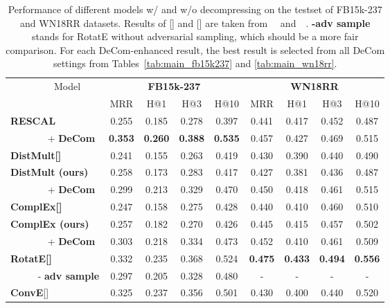 \documentclass[letterpaper]{article} \usepackage{aaai20}  \usepackage{times}  \usepackage{helvet} \usepackage{courier}  \usepackage{booktabs}
\begin{document}
\begin{table*}[t]
    \centering
    \begin{tabular}{|l|cccc|cccc|}
    \toprule
        \multirow{2}{*}{~~~~~~~~~Model} &  \multicolumn{4}{|c|}{\textbf{FB15k-237}} &  \multicolumn{4}{|c|}{\textbf{WN18RR}} \\
         &  MRR & H@1 & H@3&  H@10&  MRR & H@1 & H@3 & H@10\\
        \midrule
        \textbf{RESCAL} & 0.255 & 0.185 & 0.278 & 0.397 & 0.441 & 0.417 & 0.452 & 0.487\\
        ~~~~~~~ + \textbf{DeCom} & \textbf{0.353} & \textbf{0.260} & \textbf{0.388} & \textbf{0.535}  & 0.457 & 0.427 & 0.469 & 0.515\\
        \midrule
        \textbf{DistMult[]} & 0.241 & 0.155 & 0.263 & 0.419 & 0.430 & 0.390 & 0.440 & 0.490\\
        \textbf{DistMult (ours)} & 0.258 & 0.173 & 0.283 & 0.417 & 0.427 & 0.381 & 0.436 & 0.487\\
        ~~~~~~~ + \textbf{DeCom} & 0.299 & 0.213 & 0.329 & 0.470 & 0.450 & 0.418 & 0.461 & 0.515 \\
        \midrule
        \textbf{ComplEx[]} & 0.247 & 0.158 & 0.275 & 0.428 & 0.440 & 0.410 & 0.460 & 0.510\\
        \textbf{ComplEx (ours)} & 0.257 & 0.182 & 0.270& 0.426& 0.445 & 0.415 & 0.457 & 0.502\\
        ~~~~~~~ + \textbf{DeCom} & 0.303 & 0.218 & 0.334 & 0.473& 0.452 & 0.410 & 0.461 & 0.509\\
        \midrule
        \textbf{RotatE[]} & 0.332 & 0.235 & 0.368 & 0.524 & \textbf{0.475} & \textbf{0.433} & \textbf{0.494} & \textbf{0.556}\\
         ~~~~~ - \textbf{adv sample} & 0.297 & 0.205 & 0.328 & 0.480 &- &- &- &-\\
        \midrule
        \textbf{ConvE}[] & 0.325 & 0.237 & 0.356 & 0.501 & 0.430 & 0.400 & 0.440 & 0.520\\
        \bottomrule
    \end{tabular}
    \caption{Performance of different models w/ and w/o decompressing on the testset of FB15k-237 and WN18RR datasets. Results of [] and [] are taken from~\citeauthor{dettmers2018convolutional}~ and~\citeauthor{sun2019rotate}~. \textbf{-adv sample} stands for RotatE without adversarial sampling, which should be a more fair comparison. For each DeCom-enhanced result, the best result is selected from all DeCom settings from Tables~\ref{tab:main_fb15k237} and \ref{tab:main_wn18rr}.}
    \label{tab:main_res}
    \vspace{-3mm}
\end{table*}
\end{document}
